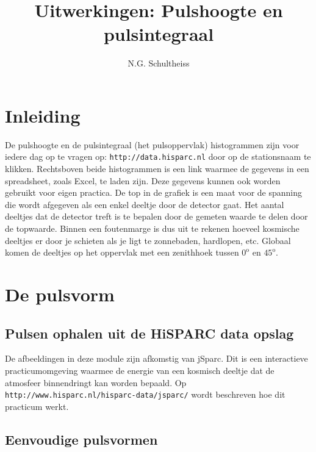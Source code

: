 



\title{Uitwerkingen: Pulshoogte en pulsintegraal}


\author{N.G. Schultheiss}

\maketitle

\section{Inleiding}

De pulshoogte en de pulsintegraal (het pulsoppervlak) histogrammen
zijn voor iedere dag op te vragen op: \texttt{\small{http://data.hisparc.nl}}
door op de stationsnaam te klikken. Rechtsboven beide histogrammen
is een link waarmee de gegevens in een spreadsheet, zoals Excel\textregistered,
te laden zijn. Deze gegevens kunnen ook worden gebruikt voor eigen
practica. De top in de grafiek is een maat voor de spanning die wordt
afgegeven als een enkel deeltje door de detector gaat. Het aantal
deeltjes dat de detector treft is te bepalen door de gemeten waarde
te delen door de topwaarde. Binnen een foutenmarge is dus uit te rekenen
hoeveel kosmische deeltjes er door je schieten als je ligt te zonnebaden,
hardlopen, etc. Globaal komen de deeltjes op het oppervlak met een
zenithhoek tussen $0^{\mathrm{o}}$ en $45^{\mathrm{o}}$.


\section{De pulsvorm}


\subsection{Pulsen ophalen uit de HiSPARC data opslag}

De afbeeldingen in deze module zijn afkomstig van jSparc. Dit is een
interactieve practicumomgeving waarmee de energie van een kosmisch
deeltje dat de atmosfeer binnendringt kan worden bepaald. Op \texttt{\small{http://www.hisparc.nl/hisparc-data/jsparc/}}
wordt beschreven hoe dit practicum werkt.


\subsection{Eenvoudige pulsvormen}

